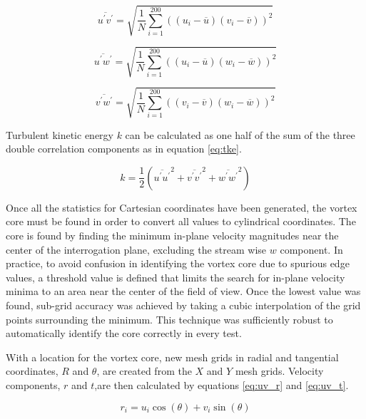 \begin{equation}
\overline{u^\prime v^\prime} = \sqrt{\frac{1}{N} \sum_{i=1}^{200} 
	((u_i - \overline{u})(v_i - \overline{v}))^2}
\end{equation}

\begin{equation}
\overline{u^\prime w^\prime} = \sqrt{\frac{1}{N} \sum_{i=1}^{200} 
	((u_i - \overline{u})(w_i - \overline{w}))^2}
\end{equation}

\begin{equation}
\overline{v^\prime w^\prime} = \sqrt{\frac{1}{N} \sum_{i=1}^{200} 
	((v_i - \overline{v})(w_i - \overline{w}))^2}
\label{eq:rs_vw}
\end{equation}

Turbulent kinetic energy $k$ can be calculated as one half 
of the sum of the three double correlation components as in equation 
\ref{eq:tke}.

\begin{equation}
k = \frac{1}{2} \left(\overline{u^\prime u^\prime}^2 + 
	\overline{v^\prime v^\prime}^2 + 
	\overline{w^\prime w^\prime}^2\right)
\label{eq:tke}
\end{equation}


Once all the statistics for Cartesian coordinates have been generated, the 
vortex core must be found in order to convert all values to cylindrical 
coordinates. The core is found by finding the minimum in-plane velocity 
magnitudes near the center of the interrogation plane, excluding the stream 
wise $w$ component. In practice, to avoid confusion in identifying the vortex 
core due to spurious edge values, a threshold value is defined that limits the 
search for in-plane velocity minima to an area near the center of the field of 
view. Once the lowest value was found, sub-grid accuracy was 
achieved by taking a cubic interpolation of the grid points surrounding the 
minimum. This technique was sufficiently robust to automatically identify the 
core correctly in every test.

With a location for the vortex core, new mesh grids in radial and tangential 
coordinates, $R$ and $\theta$, are created from the $X$ and 
$Y$ mesh grids. Velocity components, $r$ and $t$,are then 
calculated by equations \ref{eq:uv_r} and \ref{eq:uv_t}.

\begin{equation}
r_i = u_i \cos{(\theta)} + v_i \sin{(\theta)}
\label{eq:uv_r}
\end{equation}

